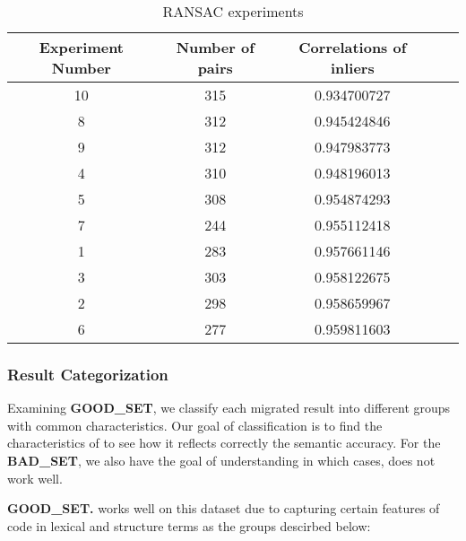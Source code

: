 \begin{table}
	\caption{RANSAC experiments}
	\begin{tabular}{|c|c|c|c|c|}
		\hline
		Experiment Number & Number of pairs & Correlations of inliers \\
		\hline
		10	& 315	& 0.934700727 \\		
		8	& 312	& 0.945424846 \\	
		9	& 312	& 0.947983773 \\
		4	& 310	& 0.948196013 \\
		{\cellcolor[gray]{.8}}5	& {\cellcolor[gray]{.8}}308	& {\cellcolor[gray]{.8}}0.954874293 \\
		7	& 244	& 0.955112418 \\	
		1	& 283	& 0.957661146 \\
		3	& 303	& 0.958122675 \\
		2	& 298	& 0.958659967 \\
		6	& 277	& 0.959811603 \\		
		\hline
	\end{tabular}
	\label{table:RANSAC_experiments}
\end{table}


\subsubsection{Result Categorization}

Examining \textbf{GOOD\_SET}, we classify each migrated result into
different groups with common characteristics. Our goal of
classification is to find the characteristics of {\model} to see how
it reflects correctly the semantic accuracy. For the {\bf BAD\_SET},
we also have the goal of understanding in which cases, {\model} does
not work well.



\textbf{GOOD\_SET.} {\model} works well on this dataset due to capturing certain features of code in lexical and structure terms as the groups descirbed below:

